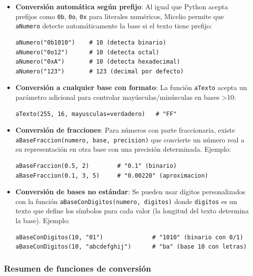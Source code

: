 \documentclass[12pt]{article}
\begin{document}
\begin{itemize}
    \item \textbf{Conversión automática según prefijo}: Al igual que Python acepta prefijos como \texttt{0b}, \texttt{0o}, \texttt{0x} para literales numéricos, Micelio permite que \texttt{aNumero} detecte automáticamente la base si el texto tiene prefijo:
    \begin{lstlisting}
aNumero("0b1010")    # 10 (detecta binario)
aNumero("0o12")      # 10 (detecta octal)
aNumero("0xA")       # 10 (detecta hexadecimal)
aNumero("123")       # 123 (decimal por defecto)
    \end{lstlisting}
    
    \item \textbf{Conversión a cualquier base con formato}: La función \texttt{aTexto} acepta un parámetro adicional para controlar mayúsculas/minúsculas en bases >10:
    \begin{lstlisting}
aTexto(255, 16, mayusculas=verdadero)   # "FF"
    \end{lstlisting}
    
    \item \textbf{Conversión de fracciones}: Para números con parte fraccionaria, existe \texttt{aBaseFraccion(numero, base, precision)} que convierte un número real a su representación en otra base con una precisión determinada. Ejemplo:
    \begin{lstlisting}
aBaseFraccion(0.5, 2)        # "0.1" (binario)
aBaseFraccion(0.1, 3, 5)     # "0.00220" (aproximacion)
    \end{lstlisting}
    
    \item \textbf{Conversión de bases no estándar}: Se pueden usar dígitos personalizados con la función \texttt{aBaseConDigitos(numero, digitos)} donde \texttt{digitos} es un texto que define los símbolos para cada valor (la longitud del texto determina la base). Ejemplo:
    \begin{lstlisting}
aBaseConDigitos(10, "01")              # "1010" (binario con 0/1)
aBaseConDigitos(10, "abcdefghij")      # "ba" (base 10 con letras)
    \end{lstlisting}
\end{itemize}

\subsubsection{Resumen de funciones de conversión}
\end{document}
